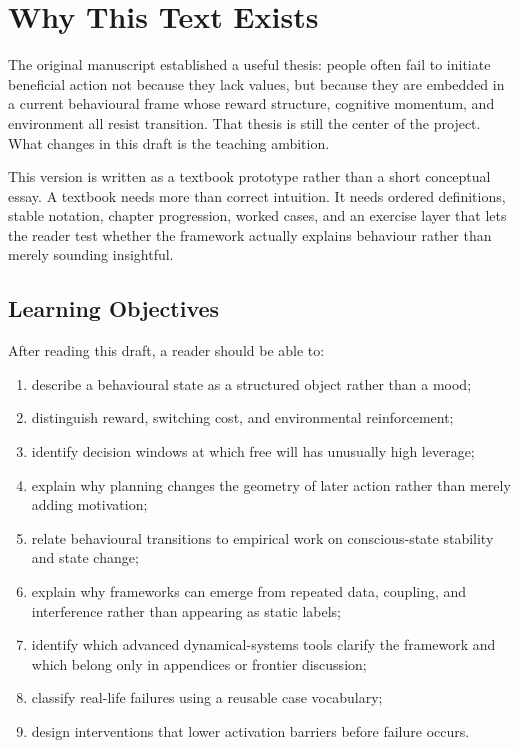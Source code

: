 \chapter{Why This Text Exists}
\label{ch:overview}

The original manuscript established a useful thesis: people often fail to
initiate beneficial action not because they lack values, but because they are
embedded in a current behavioural frame whose reward structure, cognitive
momentum, and environment all resist transition. That thesis is still the
center of the project. What changes in this draft is the teaching ambition.

This version is written as a textbook prototype rather than a short conceptual
essay. A textbook needs more than correct intuition. It needs ordered
definitions, stable notation, chapter progression, worked cases, and an
exercise layer that lets the reader test whether the framework actually
explains behaviour rather than merely sounding insightful.

\section{Learning Objectives}

After reading this draft, a reader should be able to:
\begin{enumerate}[nosep]
  \item describe a behavioural state as a structured object rather than a mood;
  \item distinguish reward, switching cost, and environmental reinforcement;
  \item identify decision windows at which free will has unusually high
        leverage;
  \item explain why planning changes the geometry of later action rather than
        merely adding motivation;
  \item relate behavioural transitions to empirical work on conscious-state
        stability and state change;
  \item explain why frameworks can emerge from repeated data, coupling, and
        interference rather than appearing as static labels;
  \item identify which advanced dynamical-systems tools clarify the framework
        and which belong only in appendices or frontier discussion;
  \item classify real-life failures using a reusable case vocabulary;
  \item design interventions that lower activation barriers before failure
        occurs.
\end{enumerate}

